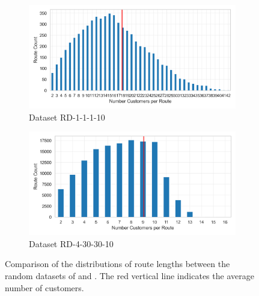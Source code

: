 \begin{figure}[ht]
	\centering
	\begin{subfigure}{.8\textwidth}
		\centering
		\includegraphics[width=\linewidth]{pictures/dataset_structure/no_cust_plot_RandomData_1_1_1_10.png}
		\caption{Dataset RD-1-1-1-10}
		\label{fig:ds-a-krebs_lop}
	\end{subfigure}
	\begin{subfigure}{.8\textwidth}
		\centering
		\includegraphics[width=\linewidth]{pictures/dataset_structure/no_cust_plot_RandomData_4_30_30_10.png}
		\caption{Dataset RD-4-30-30-10}
		\label{fig:ds-b-krebs_luf}
	\end{subfigure}
	\caption[Comparison of the distributions of route lengths between the random datasets of \krebsADataSetText and \gendreauDataSet.]
	{Comparison of the distributions of route lengths between the random datasets of \krebsADataSetText and \gendreauDataSet. The red vertical line indicates the average number of customers.}
	\label{fig:route_cust_no_krebs_new}
\end{figure}


